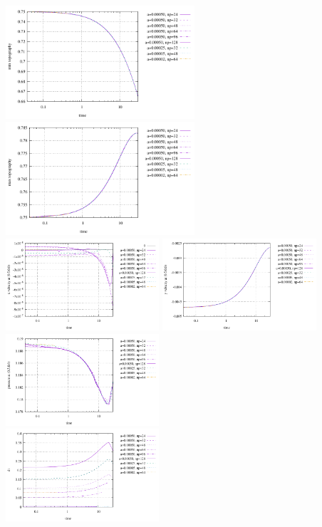 \begin{center}
\includegraphics[width=7cm]{python_codes/fieldstone_93/results_exp2/topography_min}
\includegraphics[width=7cm]{python_codes/fieldstone_93/results_exp2/topography_max}\\
\includegraphics[width=5.7cm]{python_codes/fieldstone_93/results_exp2/point_u}
\includegraphics[width=5.7cm]{python_codes/fieldstone_93/results_exp2/point_v}
\includegraphics[width=5.7cm]{python_codes/fieldstone_93/results_exp2/point_p}\\
\includegraphics[width=5.7cm]{python_codes/fieldstone_93/results_exp2/dt}

\end{center}
